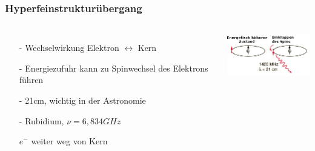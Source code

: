 \begin{frame}
	\frametitle{Hyperfeinstrukturübergang}
	\begin{columns}
		\begin{itemize}
			\item[-] Wechselwirkung Elektron $\leftrightarrow$ Kern
			\item[-] Energiezufuhr kann zu Spinwechsel des Elektrons führen
			\item[ ]
			\item[-] 21cm, wichtig in der Astronomie
			\item[] 
			\item[-] Rubidium, $\nu =6,834 GHz$
			\item[ ] $e^-$ weiter weg von Kern
		\end{itemize}
		\includegraphics[width = 4cm]{./pictures/h21b}
	\end{columns}
	
\end{frame}



